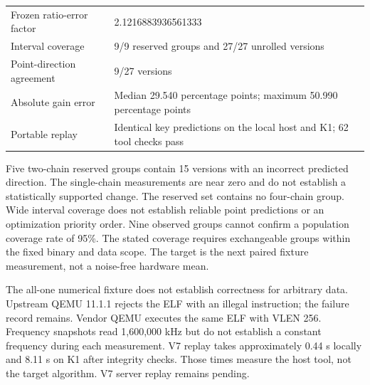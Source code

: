 \documentclass[10pt,a4paper]{article}
\begin{document}
\begin{longtable}[]{@{}ll@{}}
\begin{minipage}[t]{0.47\columnwidth}
Frozen ratio-error factor\strut
\end{minipage} & \begin{minipage}[t]{0.47\columnwidth}\raggedright
2.1216883936561333\strut
\end{minipage}\tabularnewline
\begin{minipage}[t]{0.47\columnwidth}\raggedright
Interval coverage\strut
\end{minipage} & \begin{minipage}[t]{0.47\columnwidth}\raggedright
9/9 reserved groups and 27/27 unrolled versions\strut
\end{minipage}\tabularnewline
\begin{minipage}[t]{0.47\columnwidth}\raggedright
Point-direction agreement\strut
\end{minipage} & \begin{minipage}[t]{0.47\columnwidth}\raggedright
9/27 versions\strut
\end{minipage}\tabularnewline
\begin{minipage}[t]{0.47\columnwidth}\raggedright
Absolute gain error\strut
\end{minipage} & \begin{minipage}[t]{0.47\columnwidth}\raggedright
Median 29.540 percentage points; maximum 50.990 percentage points\strut
\end{minipage}\tabularnewline
\begin{minipage}[t]{0.47\columnwidth}\raggedright
Portable replay\strut
\end{minipage} & \begin{minipage}[t]{0.47\columnwidth}\raggedright
Identical key predictions on the local host and K1; 62 tool checks
pass\strut
\end{minipage}\tabularnewline
\bottomrule
\end{longtable}

Five two-chain reserved groups contain 15 versions with an incorrect
predicted direction. The single-chain measurements are near zero and do
not establish a statistically supported change. The reserved set
contains no four-chain group. Wide interval coverage does not establish
reliable point predictions or an optimization priority order. Nine
observed groups cannot confirm a population coverage rate of 95\%. The
stated coverage requires exchangeable groups within the fixed binary and
data scope. The target is the next paired fixture measurement, not a
noise-free hardware mean.

The all-one numerical fixture does not establish correctness for
arbitrary data. Upstream QEMU 11.1.1 rejects the ELF with an illegal
instruction; the failure record remains. Vendor QEMU executes the same
ELF with VLEN 256. Frequency snapshots read 1,600,000 kHz but do not
establish a constant frequency during each measurement. V7 replay takes
approximately 0.44 s locally and 8.11 s on K1 after integrity checks.
Those times measure the host tool, not the target algorithm. V7 server
replay remains pending.
\end{document}
